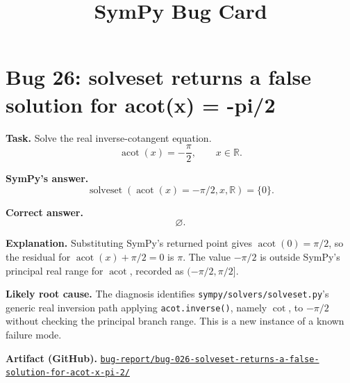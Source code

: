 \documentclass[11pt]{article}
\title{SymPy Bug Card}
\author{}
\date{}
\newcommand{\artifactrepo}{https://github.com/TODO-org/TODO-repo}
\newcommand{\bugbundle}[1]{\href{\artifactrepo/tree/main/bug-report/#1}{\nolinkurl{bug-report/#1/}}}
\begin{document}
\maketitle

\section*{Bug 26: solveset returns a false solution for acot(x) = -pi/2}

\begin{counterexamplebox}
\textbf{Task.} Solve the real inverse-cotangent equation.
\[
  \operatorname{acot}(x)=-\frac{\pi}{2},\qquad x\in\mathbb{R}.
\]

\medskip
\textbf{SymPy's answer.}
\[
  \operatorname{solveset}(\operatorname{acot}(x)=-\pi/2,x,\mathbb{R})=\{0\}.
\]

\medskip
\textbf{Correct answer.}
\[
  \varnothing.
\]

\medskip
\textbf{Explanation.} Substituting SymPy's returned point gives
\(\operatorname{acot}(0)=\pi/2\), so the residual for
\(\operatorname{acot}(x)+\pi/2=0\) is \(\pi\). The value \(-\pi/2\) is outside
SymPy's principal real range for \(\operatorname{acot}\), recorded as
\((-\pi/2,\pi/2]\).

\medskip
\textbf{Likely root cause.} The diagnosis identifies
\nolinkurl{sympy/solvers/solveset.py}'s generic real inversion path applying
\texttt{acot.inverse()}, namely \(\cot\), to \(-\pi/2\) without checking the
principal branch range. This is a new instance of a known failure mode.

\medskip
\textbf{Artifact (GitHub).} \bugbundle{bug-026-solveset-returns-a-false-solution-for-acot-x-pi-2}
\end{counterexamplebox}
\end{document}
